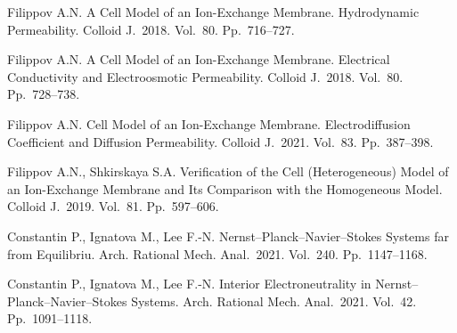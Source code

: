 \documentclass[12pt]{llncs}
\begin{document}
\begin{thebibliography}{9}
%
%
 Filippov A.N.  A Cell Model of an Ion-Exchange Membrane. Hydrodynamic Permeability. Colloid J.~2018. Vol.~80. Pp.~716--727.

 Filippov A.N.  A Cell Model of an Ion-Exchange Membrane. Electrical Conductivity and Electroosmotic Permeability. Colloid J.~2018. Vol.~80. Pp.~728--738.

 Filippov A.N.  Cell Model of an Ion-Exchange Membrane. Electrodiffusion Coefficient and Diffusion Permeability. Colloid J.~2021. Vol.~83. Pp.~387--398.

 Filippov A.N., Shkirskaya S.A.  Verification of the Cell (Heterogeneous) Model of an Ion-Exchange Membrane and Its Comparison with the Homogeneous Model. Colloid J.~2019. Vol.~81. Pp.~597--606.

  Constantin P., Ignatova M.,  Lee F.-N. Nernst–Planck–Navier–Stokes Systems far
from Equilibriu.  Arch. Rational Mech. Anal.~2021. Vol.~240. Pp.~1147--1168.

  Constantin P., Ignatova M.,  Lee F.-N.  Interior Electroneutrality in
Nernst–Planck–Navier–Stokes Systems. Arch. Rational Mech. Anal.~2021. Vol.~42. Pp.~1091--1118.

%
%

\end{thebibliography}

\end{document}
